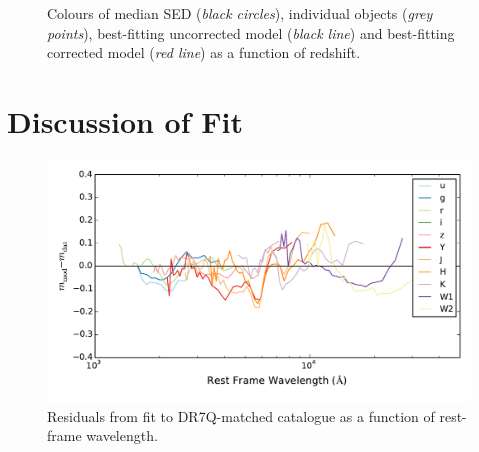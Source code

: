\begin{figure}
\caption{Colours of median SED ({\it black circles}), individual objects ({\it grey points}), best-fitting uncorrected model ({\it black line}) and best-fitting corrected model ({\it red line}) as a function of redshift.}
  \label{fig:color_2}
\end{figure} 


\section{Discussion of Fit}

\begin{figure}
  \centering
  \includegraphics[width=\textwidth]{figures/chapter06/residuals_nocorr}
  \caption{Residuals from fit to DR7Q-matched catalogue as a function of rest-frame wavelength.}
  \label{fig:residuals}
\end{figure}

